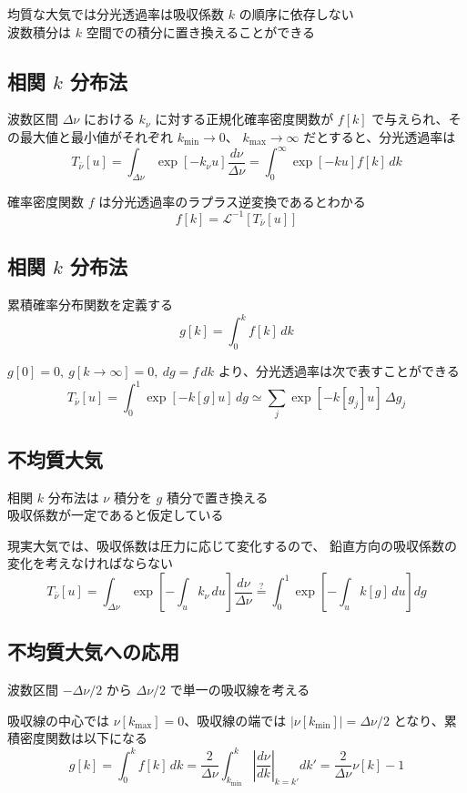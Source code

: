 \documentclass[article,nontitlepage,]{dennou777}
\begin{document}
均質な大気では分光透過率は吸収係数 $k$ の順序に依存しない\\
波数積分は $k$ 空間での積分に置き換えることができる

\subsection{相関 $k$ 分布法}
波数区間 $\Delta\nu$ における $k_\nu$ に対する正規化確率密度関数が
$f[k]$ で与えられ、その最大値と最小値がそれぞれ $k_{\mathrm{min}}\to0$、
$k_{\mathrm{max}}\to\infty$ だとすると、分光透過率は
\[T_{\bar\nu}[u]=\int_{\Delta\nu}\exp[-k_\nu u]\frac{d\nu}{\Delta\nu}=\int^\infty_0 \exp[-ku]f[k]\,dk\]

確率密度関数 $f$ は分光透過率のラプラス逆変換であるとわかる
\[f[k]=\mathcal{L}^{-1}[T_{\bar\nu}[u]]\]

\subsection{相関 $k$ 分布法}
累積確率分布関数を定義する
\[g[k]=\int^k_0 f[k]\,dk\]

$g[0]=0,\ g[k\to\infty]=0,\ dg=f\,dk$ より、分光透過率は次で表すことができる
\[T_{\bar\nu}[u]=\int^1_0 \exp[-k[g]u]\,dg\simeq\sum_j\exp[-k[g_j]u]\,\Delta g_j\]

\subsection{不均質大気}
相関 $k$ 分布法は $\nu$ 積分を $g$ 積分で置き換える\\
吸収係数が一定であると仮定している

現実大気では、吸収係数は圧力に応じて変化するので、
鉛直方向の吸収係数の変化を考えなければならない
\[
	T_{\bar\nu}[u]
	=\int_{\Delta\nu}\exp\left[-\int_u k_\nu\,du\right]\frac{d\nu}{\Delta\nu}
	\stackrel{?}{=}\int^1_0\exp\left[-\int_uk[g]\,du\right]dg
\]

\subsection{不均質大気への応用}
波数区間 $-\Delta\nu/2$ から $\Delta\nu/2$ で単一の吸収線を考える

吸収線の中心では $\nu[k_{\mathrm{max}}]=0$、吸収線の端では
$|\nu[k_{\mathrm{min}}]|=\Delta\nu/2$ となり、累積密度関数は以下になる
\[
	g[k]=\int^k_0 f[k]\,dk
	=\frac{2}{\Delta\nu}\int^k_{k_{\mathrm{min}}}\left|\frac{d\nu}{dk}\right|_{k=k'}dk'
	=\frac{2}{\Delta\nu}\nu[k]-1
\]
\end{document}
